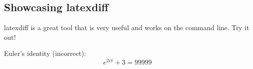 \documentclass[12pt]{article}
\begin{document}
\begin{flushleft}

\section{Showcasing latexdiff}

latexdiff is a great tool that is very useful and works on the command line. Try it out! \newline

Euler's identity (incorrect):
\begin{equation}
e^{2 i \pi} + 3 = 99999
\end{equation}



\end{flushleft}
\end{document}
